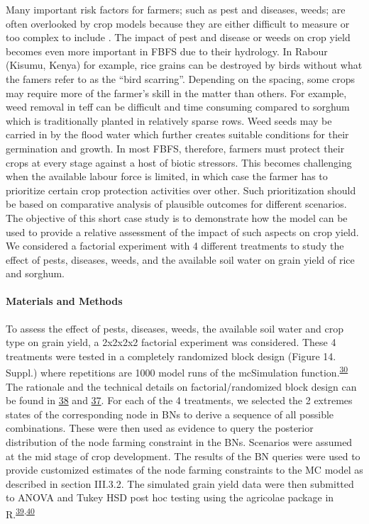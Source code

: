 \documentclass[11pt,preprint]{article}
\begin{document}
Many important risk factors for farmers; such as pest and diseases,
weeds; are often overlooked by crop models because they are either
difficult to measure or too complex to include . The impact of pest and
disease or weeds on crop yield becomes even more important in FBFS due
to their hydrology. In Rabour (Kisumu, Kenya) for example, rice grains
can be destroyed by birds without what the famers refer to as the ``bird
scarring''. Depending on the spacing, some crops may require more of the
farmer's skill in the matter than others. For example, weed removal in
teff can be difficult and time consuming compared to sorghum which is
traditionally planted in relatively sparse rows. Weed seeds may be
carried in by the flood water which further creates suitable conditions
for their germination and growth. In most FBFS, therefore, farmers must
protect their crops at every stage against a host of biotic stressors.
This becomes challenging when the available labour force is limited, in
which case the farmer has to prioritize certain crop protection
activities over other. Such prioritization should be based on
comparative analysis of plausible outcomes for different scenarios. The
objective of this short case study is to demonstrate how the model can
be used to provide a relative assessment of the impact of such aspects
on crop yield. We considered a factorial experiment with 4 different
treatments to study the effect of pests, diseases, weeds, and the
available soil water on grain yield of rice and sorghum.

\hypertarget{materials-and-methods-1}{%
\paragraph{Materials and Methods}\label{materials-and-methods-1}}

To assess the effect of pests, diseases, weeds, the available soil water
and crop type on grain yield, a 2x2x2x2 factorial experiment was
considered. These 4 treatments were tested in a completely randomized
block design (Figure 14. Suppl.) where repetitions are 1000 model runs
of the mcSimulation
function.\textsuperscript{\protect\hyperlink{ref-Luedeling_and_Goehring_2018}{30}}
The rationale and the technical details on factorial/randomized block
design can be found in
\protect\hyperlink{ref-Panse_and_Sukhatme_1957}{38} and
\protect\hyperlink{ref-Gomez_and_Gomez_1984}{37}. For each of the 4
treatments, we selected the 2 extremes states of the corresponding node
in BNs to derive a sequence of all possible combinations. These were
then used as evidence to query the posterior distribution of the node
farming constraint in the BNs. Scenarios were assumed at the mid stage
of crop development. The results of the BN queries were used to provide
customized estimates of the node farming constraints to the MC model as
described in section III.3.2. The simulated grain yield data were then
submitted to ANOVA and Tukey HSD post hoc testing using the agricolae
package in
R.\textsuperscript{\protect\hyperlink{ref-DeMendiburu_2016}{39},\protect\hyperlink{ref-RCoreTeam_2018}{40}}
\end{document}
